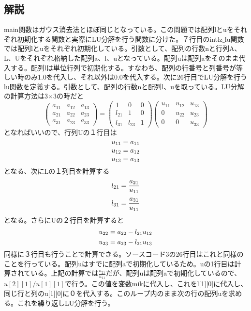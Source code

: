 \documentclass{jsarticle}
\begin{document}
\subsection{解説}
main関数はガウス消去法とほぼ同じとなっている。この問題では配列lとuをそれぞれ初期化する関数と実際にLU分解を行う関数に分けた。７行目のintlz$\_$lu関数では配列lとuをそれぞれ初期化している。引数として、配列の行数nと行列A、L、Uをそれぞれ格納した配列a、l、uとなっている。配列uは配列aをそのまま代入する。配列lは単位行列で初期化する。すなわち、配列の行番号と列番号が等しい時のみ1.0を代入し、それ以外は0.0を代入する。次に26行目でLU分解を行うlu関数を定義する。引数として、配列の行数nと配列l、uを取っている。LU分解の計算方法は3$\times$3の時だと
\[
  \left(
    \begin{array}{ccc}
      a_{11} & a_{12} & a_{13} \\
      a_{21} & a_{22} & a_{23} \\
      a_{31} & a_{23} & a_{33}
     \end{array}
  \right)=
  \left(
  \begin{array}{ccc}
      1 & 0 & 0 \\
      l_{21} & 1 & 0 \\
      l_{31} & l_{23} & 1
     \end{array}
  \right)
  \left(
    \begin{array}{ccc}
      u_{11} & u_{12} & u_{13} \\
      0 & u_{22} & u_{23} \\
      0 & 0 & u_{33}
     \end{array}
  \right)
 \]
 となればいいので、行列Uの１行目は
\[
 u_{11}=a_{11} \\
\]
\[
 u_{12}=a_{12} \\
\]
\[
 u_{13}=a_{13} \\
\]
となる、次にLの１列目を計算する
\[
 l_{21}=\frac{a_{21}}{u_{11}} \\
\]
\[
 l_{31}=\frac{a_{31}}{u_{11}} \\
\]
となる。さらにUの２行目を計算すると
\[
 u_{22}=a_{22}-l_{21}u_{12} \\
\]
\[
 u_{23}=a_{23}-l_{21}u_{13} \\
\]
同様に３行目も行うことで計算できる。ソースコード3の26行目はこれと同様のことを行っている。配列uはすでに配列aで初期化しているため。uの1行目は計算されている。上記の計算では$\frac{a_{21}}{u_{11}}$だが、配列uは配列aで初期化しているので、$u[2][1]/u[1][1]$で行う。この値を変数mikに代入し、これをl[1][0]に代入し、同じ行と列のu[1][0]に０を代入する。このループ内のまま次の行の配列uを求める。これを繰り返しLU分解を行う。
\end{document}
